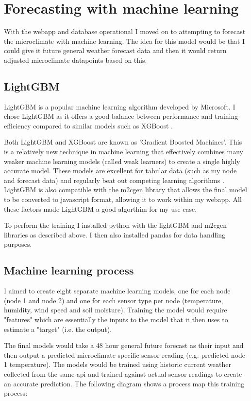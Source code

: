 \section{Forecasting with machine learning}

With the webapp and database operational I moved on to attempting to forecast
the microclimate with machine learning. The idea for this model would be that I
could give it future general weather forecast data and then it would return
adjusted microclimate datapoints based on this.


\subsection{LightGBM}

LightGBM is a popular machine learning algorithm developed by Microsoft. I chose
LightGBM as it offers a good balance between performance and training efficiency
compared to similar models such as XGBoost \cite{saha2025}.

Both LightGBM and XGBoost are known as 'Gradient Boosted Machines'. This is a
relatively new technique in machine learning that effectively combines many
weaker machine learning models (called weak learners) to create a single highly
accurate model. These models are excellent for tabular data (such as my node and
forecast data) and regularly beat out competing learning algorithms
\cite{tuychiev2023}. LightGBM is also compatible with the m2cgen library that
allows the final model to be converted to javascript format, allowing it to work
within my webapp. All these factors made LightGBM a good algorthim for my use
case.

To perform the training I installed python with the lightGBM  and m2cgen
libraries as described above. I then also installed pandas for data handling
purposes.

\subsection{Machine learning process}

I aimed to create eight separate machine learning models, one for each node
(node 1 and node 2) and one for each sensor type per node (temperature,
humidity, wind speed and soil moisture). Training the model would require
"features" which are essentially the inputs to the model that it then uses to
estimate a "target" (i.e. the output).

The final models would take a 48 hour general future forecast as their input and
then output a predicted microclimate specific sensor reading (e.g. predicted
node 1 temperature). The models would be trained using historic current weather
collected from the same api and trained against actual sensor readings to create
an accurate prediction. The following diagram shows a process map this training
process:

